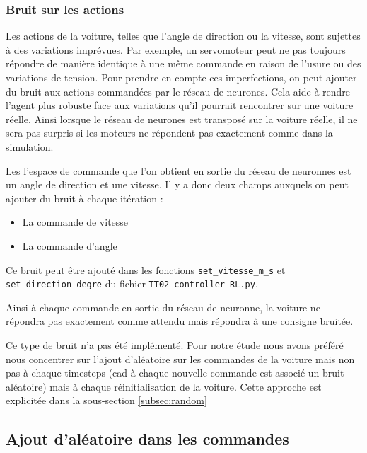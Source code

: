 \documentclass[french]{article}
\begin{document}
\subsubsection{Bruit sur les actions}

Les actions de la voiture, telles que l'angle de direction ou la vitesse, sont sujettes à des 
variations imprévues. Par exemple, un servomoteur peut ne pas toujours répondre de manière identique à une même 
commande en raison de l'usure ou des variations de tension. Pour prendre en compte ces imperfections, on peut 
ajouter du bruit aux actions commandées par le réseau de neurones. Cela aide à rendre l'agent plus robuste face 
aux variations qu'il pourrait rencontrer sur une voiture réelle. Ainsi lorsque le réseau de neurones est transposé sur la voiture réelle, il ne sera pas surpris si les moteurs ne répondent pas exactement comme dans la simulation.

\vspace{0.5cm}

Les l'espace de commande que l'on obtient en sortie du réseau de neuronnes est un angle de direction et une vitesse. Il y a donc deux champs auxquels on peut ajouter du bruit à chaque itération :
\begin{itemize}
    \item La commande de vitesse
    \item La commande d'angle
\end{itemize}

Ce bruit peut être ajouté dans les fonctions \verb|set_vitesse_m_s| et \verb|set_direction_degre| du fichier \verb|TT02_controller_RL.py|. 

Ainsi à chaque commande en sortie du réseau de neuronne, la voiture ne répondra pas exactement comme attendu mais répondra à une consigne bruitée. \vspace{0.5cm}

Ce type de bruit n'a pas été implémenté. Pour notre étude nous avons préféré nous concentrer sur l'ajout d'aléatoire sur les commandes de la voiture mais non pas à chaque timesteps (cad à chaque nouvelle commande est associé un bruit aléatoire) mais à chaque réinitialisation de la voiture. Cette approche est explicitée dans la sous-section \ref{subsec:random}

\subsection{Ajout d'aléatoire dans les commandes}
\end{document}
